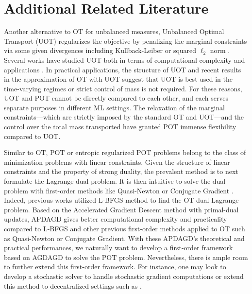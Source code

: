 \section{Additional Related Literature}
Another alternative to OT for unbalanced measures, Unbalanced Optimal Transport (UOT) regularizes the objective by penalizing the marginal constraints via some given divergences \citep{UOT_complexity, Liero_Optimal_2018} including Kullback-Leiber \citep{chizat2017scaling} or squared $\ell_2$ norm \citep{Blondel-2018-Smooth}. Several works have studied UOT both in terms of computational complexity \citep{UOT_complexity, gem-uot} and applications \citep{Janati_Wasserstein_2019, balaji2020robust, Yang_Scalable_2019}. In practical applications, the structure of UOT and recent results in the approximation of OT with UOT \citep{gem-uot} suggest that UOT is best used in the time-varying regimes %
or strict control of mass is not required. For these reasons, UOT and POT cannot be directly compared to each other, and each serves separate purposes in different ML settings. The relaxation of the marginal constraints---which are strictly imposed by the standard OT and UOT---and the control over the total mass transported have granted POT immense flexibility compared to UOT. 

Similar to OT, POT or entropic regularized POT problems belong to the class of minimization problems with linear constraints. Given the structure of linear constraints and the property of strong duality, the prevalent method is to next formulate the Lagrange dual problem. It is then intuitive to solve the dual problem with first-order methods like Quasi-Newton \citep{dennis1977quasi} or Conjugate Gradient \citep{polyak1969conjugate}. Indeed, previous works \citep{cuturi2016smoothed, blondel2018smooth} utilized L-BFGS method to find the OT dual Lagrange problem. Based on the Accelerated Gradient Descent %
method with primal-dual updates, APDAGD  \citep{Dvurechensky-2018-Computational} gives better computational complexity and practicality compared to L-BFGS and other previous first-order methods applied to OT such as Quasi-Newton or Conjugate Gradient. With these APDAGD's theoretical and practical performances, we naturally want to develop a first-order framework based on AGDAGD to solve the POT problem. Nevertheless, there is ample room to further extend this first-order framework. For instance, one may look to develop a stochastic solver to handle stochastic gradient computations \cite{hoang_nonlinear_sa} or extend this method to decentralized settings such as \cite{lan2021graph}.

